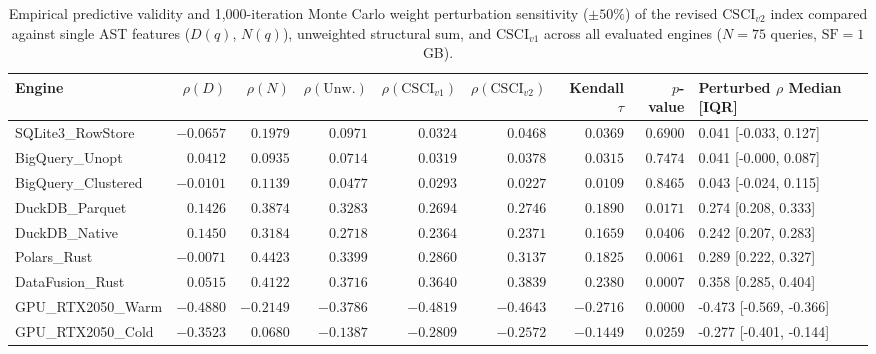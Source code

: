 \begin{table}[htbp]
\centering
\scriptsize
\setlength{\tabcolsep}{4.0pt}
\caption{Empirical predictive validity and 1,000-iteration Monte Carlo weight perturbation sensitivity ($\pm 50\%$) of the revised $\text{CSCI}_{v2}$ index compared against single AST features ($D(q)$, $N(q)$), unweighted structural sum, and $\text{CSCI}_{v1}$ across all evaluated engines ($N=75$ queries, $\text{SF}=1$ GB).}
\label{tab:csci_validation}
\begin{tabular}{@{}lrrrrrrrl@{}}
\toprule
\textbf{Engine} & \textbf{$\rho(D)$} & \textbf{$\rho(N)$} & \textbf{$\rho(\text{Unw.})$} & \textbf{$\rho(\text{CSCI}_{v1})$} & \textbf{$\rho(\text{CSCI}_{v2})$} & \textbf{Kendall $\tau$} & \textbf{$p$-value} & \textbf{Perturbed $\rho$ Median [IQR]} \\
\midrule
SQLite3\_RowStore & $-0.0657$ & $0.1979$ & $0.0971$ & $0.0324$ & $\mathbf{0.0468}$ & $0.0369$ & $0.6900$ & 0.041 [-0.033, 0.127] \\
BigQuery\_Unopt & $0.0412$ & $0.0935$ & $0.0714$ & $0.0319$ & $\mathbf{0.0378}$ & $0.0315$ & $0.7474$ & 0.041 [-0.000, 0.087] \\
BigQuery\_Clustered & $-0.0101$ & $0.1139$ & $0.0477$ & $0.0293$ & $\mathbf{0.0227}$ & $0.0109$ & $0.8465$ & 0.043 [-0.024, 0.115] \\
DuckDB\_Parquet & $0.1426$ & $0.3874$ & $0.3283$ & $0.2694$ & $\mathbf{0.2746}$ & $0.1890$ & $0.0171$ & 0.274 [0.208, 0.333] \\
DuckDB\_Native & $0.1450$ & $0.3184$ & $0.2718$ & $0.2364$ & $\mathbf{0.2371}$ & $0.1659$ & $0.0406$ & 0.242 [0.207, 0.283] \\
Polars\_Rust & $-0.0071$ & $0.4423$ & $0.3399$ & $0.2860$ & $\mathbf{0.3137}$ & $0.1825$ & $0.0061$ & 0.289 [0.222, 0.327] \\
DataFusion\_Rust & $0.0515$ & $0.4122$ & $0.3716$ & $0.3640$ & $\mathbf{0.3839}$ & $0.2380$ & $0.0007$ & 0.358 [0.285, 0.404] \\
GPU\_RTX2050\_Warm & $-0.4880$ & $-0.2149$ & $-0.3786$ & $-0.4819$ & $\mathbf{-0.4643}$ & $-0.2716$ & $0.0000$ & -0.473 [-0.569, -0.366] \\
GPU\_RTX2050\_Cold & $-0.3523$ & $0.0680$ & $-0.1387$ & $-0.2809$ & $\mathbf{-0.2572}$ & $-0.1449$ & $0.0259$ & -0.277 [-0.401, -0.144] \\
\bottomrule
\end{tabular}
\end{table}